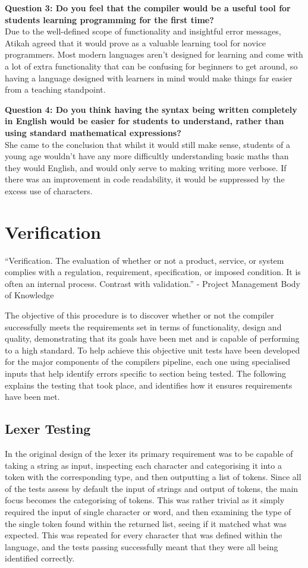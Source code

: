\documentclass[
]{report}
\begin{document}
\textbf{Question 3: Do you feel that the compiler would be a useful tool
for students learning programming for the first time?}\\
Due to the well-defined scope of functionality and insightful error
messages, Atikah agreed that it would prove as a valuable learning tool
for novice programmers. Most modern languages aren't designed for
learning and come with a lot of extra functionality that can be
confusing for beginners to get around, so having a language designed
with learners in mind would make things far easier from a teaching
standpoint.

\textbf{Question 4: Do you think having the syntax being written
completely in English would be easier for students to understand, rather
than using standard mathematical \glspl{expression}?}\\
She came to the conclusion that whilst it would still make sense,
students of a young age wouldn't have any more difficultly understanding
basic maths than they would English, and would only serve to making
writing more verbose. If there was an improvement in code readability,
it would be suppressed by the excess use of characters.

\section{Verification}
``Verification. The evaluation of whether or not a product, service, or
system complies with a regulation, requirement, specification, or
imposed condition. It is often an internal process. Contrast with
validation.'' - Project Management Body of Knowledge \cite{pmbok-book}

The objective of this procedure is to discover whether or not the
compiler successfully meets the requirements set in terms of
functionality, design and quality, demonstrating that its goals have
been met and is capable of performing to a high standard. To help
achieve this objective unit tests have been developed for the major
components of the compilers pipeline, each one using specialised inputs
that help identify errors specific to section being tested. The
following explains the testing that took place, and identifies how it
ensures requirements have been met.

\subsection{Lexer Testing}
In the original design of the lexer its primary requirement was to be
capable of taking a string as input, inspecting each character and
categorising it into a \gls{token} with the corresponding type, and then
outputting a list of \glspl{token}. Since all of the tests assess by default
the input of strings and output of \glspl{token}, the main focus becomes the
categorising of \glspl{token}. This was rather trivial as it simply required
the input of single character or word, and then examining the type of
the single \gls{token} found within the returned list, seeing if it matched
what was expected. This was repeated for every character that was
defined within the language, and the tests passing successfully meant
that they were all being identified correctly.
\end{document}
